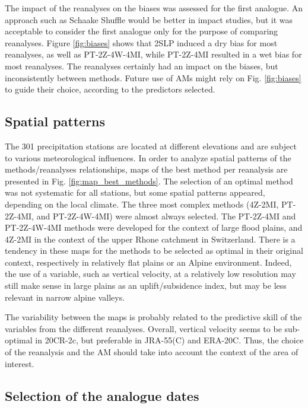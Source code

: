 \documentclass[smallextended]{svjour3}       %
\begin{document}
	The impact of the reanalyses on the biases was assessed for the first analogue. An approach such as Schaake Shuffle \citep{Clark2004a} would be better in impact studies, but it was acceptable to consider the first analogue only for the purpose of comparing reanalyses. Figure \ref{fig:biases} shows that 2SLP induced a dry bias for most reanalyses, as well as PT-2Z-4W-4MI, while PT-2Z-4MI resulted in a wet bias for most reanalyses. The reanalyses certainly had an impact on the biases, but inconsistently between methods. Future use of AMs might rely on Fig. \ref{fig:biases} to guide their choice, according to the predictors selected.
	
	
	\subsection{Spatial patterns}
	
	The 301 precipitation stations are located at different elevations and are subject to various meteorological influences. In order to analyze spatial patterns of the methods/reanalyses relationships, maps of the best method per reanalysis are presented in Fig. \ref{fig:map_best_methods}. The selection of an optimal method was not systematic for all stations, but some spatial patterns appeared, depending on the local climate. The three most complex methods (4Z-2MI, PT-2Z-4MI, and PT-2Z-4W-4MI) were almost always selected. The PT-2Z-4MI and PT-2Z-4W-4MI methods were developed for the context of large flood plains, and 4Z-2MI in the context of the upper Rhone catchment in Switzerland. There is a tendency in these maps for the methods to be selected as optimal in their original context, respectively in relatively flat plains or an Alpine environment. Indeed, the use of a variable, such as vertical velocity, at a relatively low resolution may still make sense in large plains as an uplift/subsidence index, but may be less relevant in narrow alpine valleys.
	
	The variability between the maps is probably related to the predictive skill of the variables from the different reanalyses. Overall, vertical velocity seems to be sub-optimal in 20CR-2c, but preferable in JRA-55(C) and ERA-20C. Thus, the choice of the reanalysis and the AM should take into account the context of the area of interest.
	
	
	\subsection{Selection of the analogue dates}
	
\end{document}
